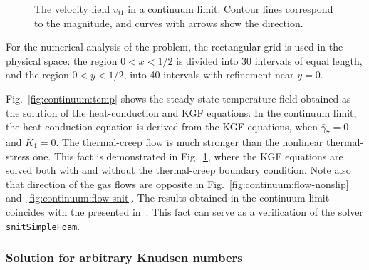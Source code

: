 \documentclass[10pt]{article}
\begin{document}
\begin{figure}
    \centering
    \caption{The velocity field \(v_{i1}\) in a continuum limit.
        Contour lines correspond to the magnitude, and curves with arrows show the direction.}
    \label{fig:continuum:flow}
\end{figure}

For the numerical analysis of the problem, the rectangular grid is used in the physical space:
the region \(0<x<1/2\) is divided into 30 intervals of equal length,
and the region \(0<y<1/2\), into 40 intervals with refinement near \(y=0\).

Fig.~\ref{fig:continuum:temp} shows the steady-state temperature field
obtained as the solution of the heat-conduction and KGF equations.
In the continuum limit, the heat-conduction equation is derived from the KGF equations,
when \(\bar{\gamma}_7=0\) and \(K_1=0\).
The thermal-creep flow is much stronger than the nonlinear thermal-stress one.
This fact is demonstrated in Fig.~\ref{fig:continuum:flow},
where the KGF equations are solved both with and without the thermal-creep boundary condition.
Note also that direction of the gas flows are opposite in Fig.~\ref{fig:continuum:flow-nonslip} and~\ref{fig:continuum:flow-snit}.
The results obtained in the continuum limit coincides with the presented in~\cite{Sone1996}.
This fact can serve as a verification of the solver \verb+snitSimpleFoam+.

\subsubsection{Solution for arbitrary Knudsen numbers}
\end{document}

